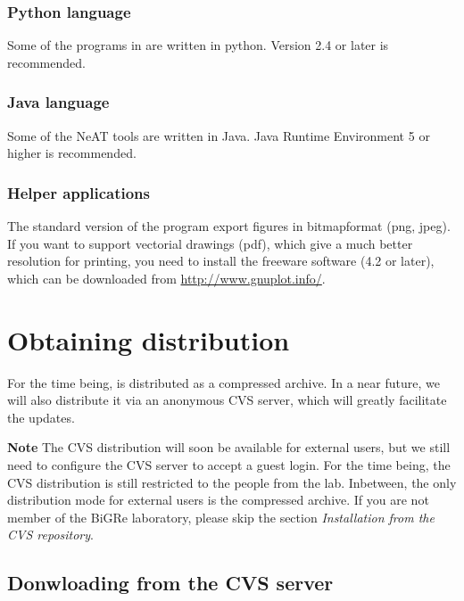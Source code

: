 \documentclass{book}
\begin{document}
\subsection{Python language}

Some of the programs in \RSAT are written in python. Version 2.4 or
later is recommended.

\subsection{Java language}

Some of the NeAT tools are written in Java. Java Runtime Environment 5 or higher is recommended.

\subsection{Helper applications}

The standard version of the program  export figures
in bitmapformat (png, jpeg). If you want to support vectorial drawings
(pdf), which give a much better resolution for printing, you need to
install the freeware software  (4.2 or later), which
can be downloaded from \url{http://www.gnuplot.info/}.



\chapter{Obtaining \RSAT distribution}

For the time being, \RSAT is distributed as a compressed archive. In a
near future, we will also distribute it via an anonymous CVS server,
which will greatly facilitate the updates.

\textbf{Note} The CVS distribution will soon be available for external
users, but we still need to configure the CVS server to accept a guest
login. For the time being, the CVS distribution is still restricted to
the people from the lab. Inbetween, the only distribution mode for
external users is the compressed archive. If you are not member of the
BiGRe laboratory, please skip the section \textit{Installation from
  the CVS repository}.

\section{Donwloading \RSAT from the CVS server}
\end{document}
